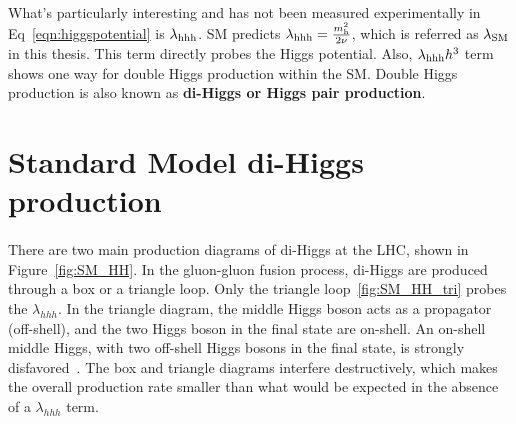 \paragraph{}
What's particularly interesting and has not been measured experimentally in Eq~\ref{eqn:higgspotential} is $\lambda_{\rm hhh}$. SM predicts $\lambda_{\rm hhh} = \frac{m_{\rm h}^2}{2\rm\nu}$, which is referred as \textbf{$\lambda_{\rm SM}$} in this thesis. This term directly probes the Higgs potential.
Also, $\lambda_{\rm hhh}h^3$ term shows one way for double Higgs production within the SM. Double Higgs production is also known as \textbf{di-Higgs or Higgs pair production}.


\section{Standard Model di-Higgs production}



\paragraph{}
There are two main production diagrams of di-Higgs at the LHC, shown in Figure~\ref{fig:SM_HH}. In the gluon-gluon  fusion process, di-Higgs are produced through a box or a triangle loop. Only the triangle loop~\ref{fig:SM_HH_tri} probes the $\lambda_{hhh}$. In the triangle diagram, the middle Higgs boson acts as a propagator (off-shell), and the two Higgs boson in the final state are on-shell. An on-shell middle Higgs, with two off-shell Higgs bosons in the final state, is strongly disfavored~\cite{Pdg}. The box and triangle diagrams interfere destructively, which makes the overall production rate smaller than what would be expected in the absence of a $\lambda_{hhh}$ term.

